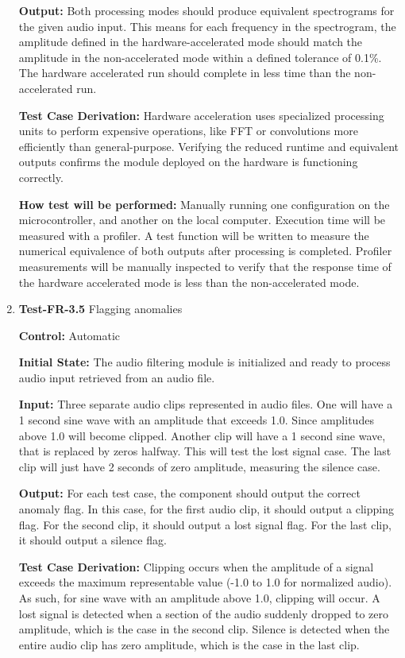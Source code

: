\documentclass[12pt, titlepage]{article}
\begin{document}
\begin{enumerate}
\textbf{Output:}
Both processing modes should produce equivalent spectrograms for the given audio
input. This means for each frequency in the spectrogram, the amplitude defined
in the hardware-accelerated mode should match the amplitude in the
non-accelerated mode within a defined tolerance of 0.1\%. The hardware
accelerated run should complete in less time than the non-accelerated run.

\textbf{Test Case Derivation:} 
Hardware acceleration uses specialized processing units to perform expensive
operations, like FFT or convolutions more efficiently than general-purpose.
Verifying the reduced runtime and equivalent outputs confirms the module
deployed on the hardware is functioning correctly. 

\textbf{How test will be performed:}
Manually running one configuration on the microcontroller, and another on the
local computer. Execution time will be measured with a profiler. A test function
will be written to measure the numerical equivalence of both outputs after
processing is completed. Profiler measurements will be manually inspected to
verify that the response time of the hardware accelerated mode is less than the
non-accelerated mode.

\item{\textbf{Test-FR-3.5} Flagging anomalies\\}

\textbf{Control:} Automatic
					
\textbf{Initial State:} 
The audio filtering module is initialized and ready to process audio input
retrieved from an audio file. 
					
\textbf{Input:}
Three separate audio clips represented in audio files. One will have a 1 second
sine wave with an amplitude that exceeds 1.0. Since amplitudes above 1.0 will
become clipped. Another clip will have a 1 second sine wave, that is replaced by
zeros halfway. This will test the lost signal case. The last clip will just have
2 seconds of zero amplitude, measuring the silence case. 
					
\textbf{Output:}
For each test case, the component should output the correct anomaly flag. In
this case, for the first audio clip, it should output a clipping flag. For the
second clip, it should output a lost signal flag. For the last clip, it should
output a silence flag.

\textbf{Test Case Derivation:} 
Clipping occurs when the amplitude of a signal exceeds the maximum representable
value (-1.0 to 1.0 for normalized audio). As such, for sine wave with an
amplitude above 1.0, clipping will occur. A lost signal is detected when a
section of the audio suddenly dropped to zero amplitude, which is the case in
the second clip. Silence is detected when the entire audio clip has zero
amplitude, which is the case in the last clip.


\end{enumerate}
\end{document}
